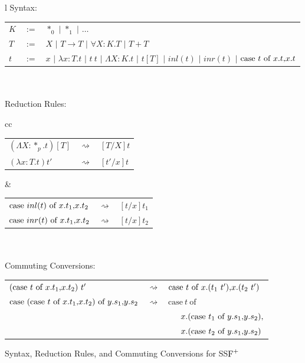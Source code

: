 \begin{figure}
  \begin{center}
    \begin{tabular}{l}
      Syntax:\\
      \begin{tabular}{lll}
        $K$ & $:=$ & $*_0$ $|$ $*_1$             $|$ $\ldots$\\
        $T$ & $:=$ & $X$   $|$ $T \rightarrow T$ $|$ $\forall X:K.T$  $|$ $T + T$\\
        $t$ & $:=$ & $x$   $|$ $\lambda x:T.t$   $|$ $t\ t$ $|$ 
        $\Lambda X:K.t$ $|$ $t[T]$ $|$ $inl(t)$ $|$ $inr(t)$ $|$ $\mbox{case}\ t\ \text{of}\ x\text{.}t\text{,}x\text{.}t$\\
      \end{tabular}
      \\ \\
      Reduction Rules:\\
      \begin{tabular}{cc}
        \begin{tabular}{lll}
          $(\Lambda X:*_p.t)[T]$ & $\rightsquigarrow$ & $[T/X]t$\\
          $(\lambda x:T.t)t'$    & $\rightsquigarrow$ & $[t'/x]t$\\
        \end{tabular}
        &
        \begin{tabular}{lll}
          $\mbox{case}\ inl(t)\ \text{of}\ x\text{.}t_1\text{,}x\text{.}t_2$ & $\rightsquigarrow$ & $[t/x]t_1$\\
          $\mbox{case}\ inr(t)\ \text{of}\ x\text{.}t_1\text{,}x\text{.}t_2$ & $\rightsquigarrow$ & $[t/x]t_2$
        \end{tabular}
      \end{tabular}
      \\ \\
      Commuting Conversions:\\
      \begin{tabular}{lll}
        $(\mbox{case}\ t\ \text{of}\ x\text{.}t_1\text{,}x\text{.}t_2)\ t'$ & $\rightsquigarrow$ & 
        $\mbox{case}\ t\ \text{of}\ x\text{.}(t_1\ t')\text{,}x\text{.}(t_2\ t')$\\
        $\mbox{case}\ (\mbox{case}\ t\ \text{of}\ x\text{.}t_1\text{,}x\text{.}t_2)\ \text{of}\ y\text{.}s_1\text{,}y\text{.}s_2$ & $\rightsquigarrow$ & 
        $\mbox{case}\ t\ \mbox{of}\ $\\
        &                    & \ \ \ $x.(\mbox{case}\ t_1\ \text{of}\ y\text{.}s_1\text{,}y\text{.}s_2),$\\
        &                    & \ \ \ $x.(\mbox{case}\ t_2\ \text{of}\ y\text{.}s_1\text{,}y\text{.}s_2)$
      \end{tabular}
    \end{tabular}
  \end{center}
  
  \caption{Syntax, Reduction Rules, and Commuting Conversions for SS$\mbox{F}^{+}$}
  \label{fig:syntax_ssfp}
\end{figure}

